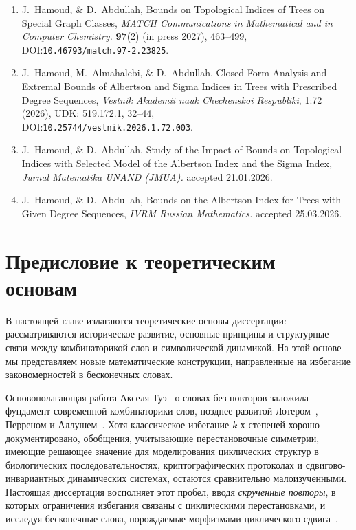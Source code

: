 \documentclass[a4paper,14pt]{extreport}
\theoremstyle{plain}
\theoremstyle{definition}
\theoremstyle{remark}
\begin{document}
	\begin{enumerate}		
		
		\item  J.~Hamoud, \& D.~Abdullah, Bounds on Topological Indices of Trees on Special Graph Classes, {\em MATCH Communications in Mathematical and in Computer Chemistry.} \textbf{97}(2) (in press 2027), 463--499, \\
		DOI:{\tt10.46793/match.97-2.23825}.
		
		\item J.~Hamoud, M.~Almahalebi, \& D.~Abdullah, Closed-Form Analysis and Extremal Bounds of Albertson and Sigma Indices in Trees with Prescribed Degree Sequences, {\em Vestnik Akademii nauk Chechenskoi Respubliki}, 1:72 (2026), UDK: 519.172.1, 32--44,\\ DOI:{\tt10.25744/vestnik.2026.1.72.003}.
		
		\item J.~Hamoud, \& D.~Abdullah, Study of the Impact of Bounds on Topological Indices with Selected Model of the Albertson Index and the Sigma Index, {\em Jurnal Matematika UNAND (JMUA).} accepted 21.01.2026.
		
		\item J.~Hamoud, \& D.~Abdullah, Bounds on the Albertson Index for Trees with Given Degree Sequences, {\em IVRM Russian Mathematics.} accepted 25.03.2026.
	\end{enumerate}
\chapter{Предисловие к теоретическим основам}

В настоящей главе излагаются теоретические основы диссертации: рассматриваются историческое развитие, основные принципы и структурные связи между комбинаторикой слов и символической динамикой. 
На этой основе мы представляем новые математические 
конструкции, направленные на избегание закономерностей в бесконечных словах.

Основополагающая работа Акселя Туэ~\cite{Thue} о словах без повторов заложила фундамент современной комбинаторики слов, позднее развитой Лотером~\cite{Lothaire2002}, Перреном и Аллушем~\cite{Perrin,Allouche}. 
Хотя классическое избегание $k$-х степеней хорошо документировано, 
обобщения, учитывающие перестановочные симметрии, имеющие решающее значение для моделирования циклических структур в биологических последовательностях, криптографических протоколах и сдвигово-инвариантных динамических системах, остаются сравнительно малоизученными. Настоящая диссертация восполняет этот пробел, вводя \emph{скрученные повторы}, в которых ограничения избегания связаны с циклическими перестановками, и исследуя бесконечные слова, порождаемые морфизмами циклического сдвига~\cite{Marcus, Allouche}.
\end{document}
